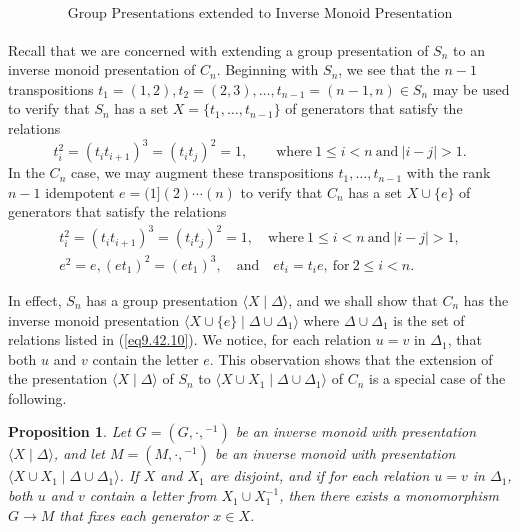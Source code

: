 \documentclass{surv-l}
\numberwithin{equation}{section}
\numberwithin{table}{section}
\numberwithin{figure}{section}
\newtheorem{proposition}[equation]{Proposition}
\theoremstyle{definition}
\begin{document}
\[
\text{Group Presentations extended to Inverse Monoid Presentation}
\]
\\
\indent Recall that we are concerned with extending a group presentation
of $S_{n}$ to an inverse monoid presentation of $C_{n}$. Beginning
with $S_{n}$, we see that the $n-1$ transpositions $t_{1}=(1,2),
t_{2}=(2,3),\ldots,t_{n-1}=(n-1,n) \in S_{n}$ may be used to
verify that $S_{n}$ has a set $X =\{t_{1},\ldots, t_{n-1}\}$ of
generators that satisfy the relations
\[
t_{i}^{2}=(t_{i}t_{i+1})^{3}=(t_{i}t_{j})^{2}=1,\qquad \mathrm{where}\ 1\leq
i<n\ \mathrm{and}\ |i-j|>1.
\]
In the $C_{n}$ case, we may augment these transpositions
$t_{1},\ldots,t_{n-1}$ with the rank $n-1$ idempotent
$e=(1](2)\cdots (n)$ to verify that $C_{n}$ has a set $X \cup\{e\}$
of generators that satisfy the relations
\begin{equation}\label{eq9.42.10}
\begin{split}
t_{i}^{2}=(t_{i}t_{i+1})^{3}=(t_{i}t_{j})^{2}=1,\quad \mathrm{where}\ 1\leq i<n\ \mathrm{and}\ |i-j|>1, \\
e^{2}=e, (et_{1})^{2}=(et_{1})^{3},\quad \mathrm{and}\quad et_{i}=t_{i}e,\ \mathrm{for}\ 2\leq i<n.\qquad
\end{split}
\end{equation}

In effect, $S_{n}$ has a group presentation $\langle X\mid
\Delta\rangle$, and we shall show that $C_{n}$ has the inverse
monoid presentation $\langle X\cup\{e\}\mid
\Delta\cup\Delta_{1}\rangle$ where
$\Delta\cup\Delta_{1}$ is the set of relations listed in
(\ref{eq9.42.10}). We notice, for each relation $u=v$ in
$\Delta_{1}$, that both $u$ and $v$ contain the letter $e$.
This observation shows that the extension of the presentation
$\langle X \mid \Delta\rangle$ of $S_{n}$ to $\langle X\cup
X_{1}\mid \Delta\cup\Delta_{1}\rangle$ of $C_{n}$ is a
special case of the following.

\begin{proposition}\label{prop9.42.11}
Let $G=(G,\cdot,{}^{-1})$ be an inverse monoid with presentation
$\langle X \mid \Delta\rangle$, and let
$M=(M,\cdot,{}^{-1})$ be an inverse monoid with presentation
$\langle X\cup X_{1}\mid \Delta\cup\Delta_{1}\rangle$.
If $X$ and $X_{1}$ are disjoint, and if for each relation $u=v$ in
$\Delta_{1}$, both $u$ and $v$ contain a letter from $X_{1}\cup
X_{1}^{-1}$, then there exists a monomorphism $G\rightarrow M$
that fixes each generator $x\in X$.
\end{proposition}
\end{document}
